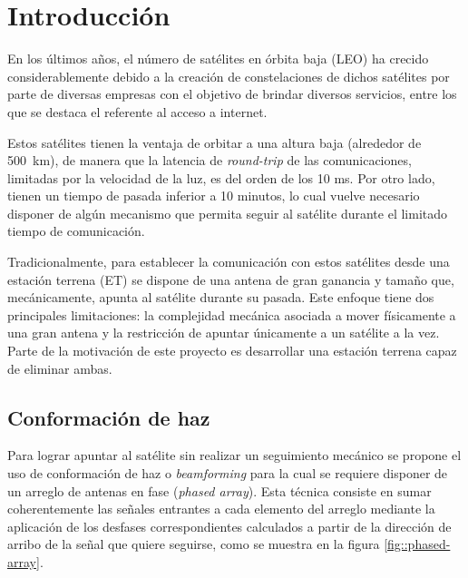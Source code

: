 \documentclass[../../main.tex]{subfiles}
\begin{document}
\graphicspath{{./figures}}
\chapter{Introducción}\label{cap::intro}


En los últimos años, el número de satélites en órbita baja (LEO) ha crecido considerablemente debido a la creación de constelaciones de dichos satélites por parte de diversas empresas \cite{LeoConstellation} con el objetivo de brindar diversos servicios, entre los que se destaca el referente al acceso a internet. 

Estos satélites tienen la ventaja de orbitar a una altura baja (alrededor de 500~km), de manera que la latencia de \textit{round-trip} de las comunicaciones, limitadas por la velocidad de la luz, es del orden de los 10 ms. 
Por otro lado, tienen un tiempo de pasada inferior a 10 minutos, lo cual vuelve necesario disponer de algún mecanismo que permita seguir al satélite durante el limitado tiempo de comunicación.

Tradicionalmente, para establecer la comunicación con estos satélites desde una estación terrena (ET) se dispone de una antena de gran ganancia y tamaño que, mecánicamente, apunta al satélite durante su pasada.
Este enfoque tiene dos principales limitaciones: la complejidad mecánica asociada a mover físicamente a una gran antena y la restricción de apuntar únicamente a un satélite a la vez. Parte de la motivación de este proyecto es desarrollar una estación terrena capaz de eliminar ambas.


\section{Conformación de haz}

Para lograr apuntar al satélite sin realizar un seguimiento mecánico se propone el uso de conformación de haz o \textit{beamforming} para la cual se requiere disponer de un arreglo de antenas en fase (\textit{phased array}). Esta técnica consiste en sumar coherentemente las señales entrantes a cada elemento del arreglo mediante la aplicación de los desfases correspondientes calculados a partir de la dirección de arribo de la señal que quiere seguirse, como se muestra en la figura \ref{fig::phased-array}.
\end{document}

